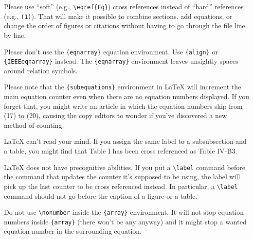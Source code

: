 \documentclass[conference]{IEEEtran}
\begin{document}
Please use ``soft'' (e.g., \verb|\eqref{Eq}|) cross references instead
of ``hard'' references (e.g., \verb|(1)|). That will make it possible
to combine sections, add equations, or change the order of figures or
citations without having to go through the file line by line.

Please don't use the \verb|{eqnarray}| equation environment. Use
\verb|{align}| or \verb|{IEEEeqnarray}| instead. The \verb|{eqnarray}|
environment leaves unsightly spaces around relation symbols.

Please note that the \verb|{subequations}| environment in {\LaTeX}
will increment the main equation counter even when there are no
equation numbers displayed. If you forget that, you might write an
article in which the equation numbers skip from (17) to (20), causing
the copy editors to wonder if you've discovered a new method of
counting.


{\LaTeX} can't read your mind. If you assign the same label to a
subsubsection and a table, you might find that Table I has been cross
referenced as Table IV-B3. 

{\LaTeX} does not have precognitive abilities. If you put a
\verb|\label| command before the command that updates the counter it's
supposed to be using, the label will pick up the last counter to be
cross referenced instead. In particular, a \verb|\label| command
should not go before the caption of a figure or a table.

Do not use \verb|\nonumber| inside the \verb|{array}| environment. It
will not stop equation numbers inside \verb|{array}| (there won't be
any anyway) and it might stop a wanted equation number in the
surrounding equation.
\end{document}
